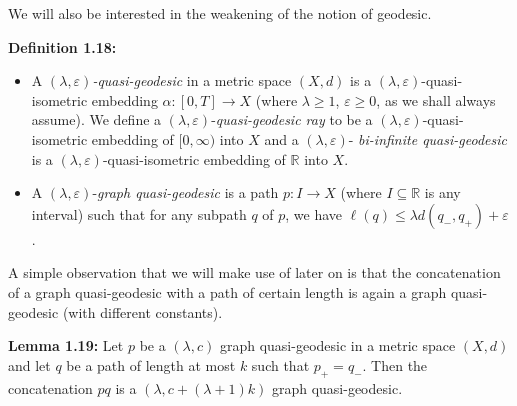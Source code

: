 \documentclass[12pt]{article}
\newcommand{\vs}{\vskip10pt}
\begin{document}
 	\vs 
 	
 	We will also be interested in the weakening of the notion of geodesic. 
 	
 	\vs 
 	
 	\textbf{Definition 1.18: } 
 	
 	\begin{itemize}
 		\item A $(\lambda, \varepsilon)$\textit{-quasi-geodesic} in a metric space $(X,d)$ is a $(\lambda, \varepsilon)$-quasi-isometric embedding $\alpha: [0,T] \rightarrow X$ (where $\lambda \geq 1$, $\varepsilon \geq 0$, as we shall always assume). We define a $(\lambda, \varepsilon)$-\textit{quasi-geodesic ray} to be a $(\lambda, \varepsilon)$-quasi-isometric embedding of $[0, \infty)$ into $X$ and a $(\lambda, \varepsilon)$-\textit{ bi-infinite quasi-geodesic} is a $(\lambda, \varepsilon)$-quasi-isometric embedding of $\mathbb{R}$ into $X$.
 		\item A $(\lambda, \varepsilon)$-\textit{graph quasi-geodesic} is a path $p: I \rightarrow X$ (where $I \subseteq \mathbb{R}$ is any interval) such that for any subpath $q$ of $p$, we have $\ell(q) \leq \lambda d(q_-, q_+) + \varepsilon$. 
 	\end{itemize}
 	
 	 
 	
 	\vs 
 	
 	A simple observation that we will make use of later on is that the concatenation of a graph quasi-geodesic with a path of certain length is again a graph quasi- geodesic (with different constants). 
 	
 	\vs 
 	
 	\textbf{Lemma 1.19: } Let $p$ be a $(\lambda, c)$ graph quasi-geodesic in a metric space $(X,d)$ and let $q$ be a path of length at most $k$ such that $p_{+} = q_{-}$. Then the concatenation $pq$ is a $(\lambda, c + (\lambda + 1)k)$ graph quasi-geodesic. 
 	
\end{document}
